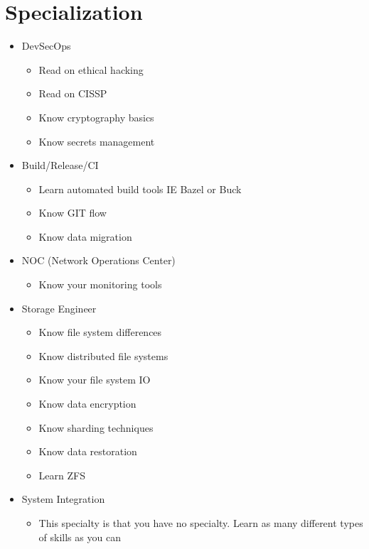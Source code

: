 \documentclass[12pt]{article}
\begin{document}
\section{Specialization}
\begin{itemize}
\item DevSecOps
  \begin{itemize}
  \item Read on ethical hacking
  \item Read on CISSP
  \item Know cryptography basics
  \item Know secrets management
  \end{itemize}
\item Build/Release/CI
  \begin{itemize}
  \item Learn automated build tools IE Bazel or Buck
  \item Know GIT flow
  \item Know data migration
  \end{itemize}
\item NOC (Network Operations Center)
  \begin{itemize}
  \item Know your monitoring tools
  \end{itemize}
\item Storage Engineer
  \begin{itemize}
  \item Know file system differences
  \item Know distributed file systems
  \item Know your file system IO
  \item Know data encryption
  \item Know sharding techniques
  \item Know data restoration
  \item Learn ZFS
  \end{itemize}
\item System Integration
  \begin{itemize}
  \item This specialty is that you have no specialty. Learn as many different types of skills as you can
  \end{itemize}
\end{itemize}
\end{document}
